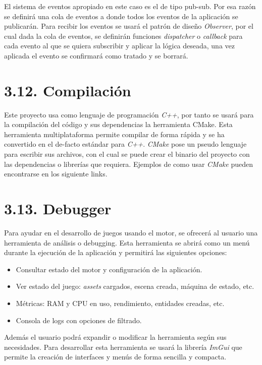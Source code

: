 El sistema de eventos apropiado en este caso es el de tipo \gls{pub-sub}\cite{event-system}. Por esa razón se definirá 
una cola de eventos a donde todos los eventos de la aplicación se publicarán. Para recibir los eventos
se usará el patrón de diseño \textit{Observer}\cite{observer-pattern}, por el cual dada la cola de eventos, se definirán
funciones \textit{dispatcher} o \textit{callback} para cada evento al que se quiera subscribir y aplicar la lógica deseada, una vez aplicada el evento
se confirmará como tratado y se borrará.

\section*{3.12. Compilación}\label{sec:compiler}

Este proyecto usa como lenguaje de programación \textit{C++}, por tanto se usará para la compilación del código y sus dependencias la herramienta
CMake\cite{cmake}. Esta herramienta multiplataforma permite compilar de forma rápida y se ha convertido
en el de-facto estándar para \textit{C++}. \textit{CMake} pose un pseudo lenguaje para escribir sus archivos, con el cual
se puede crear el binario del proyecto con las dependencias o librerías que requiera.
Ejemplos de como usar \textit{CMake} pueden encontrarse en los siguiente links\cite{using-cmake}\cite{cmake-tutorial}.

\section*{3.13. Debugger}\label{sec:debugger}

Para ayudar en el desarrollo de juegos usando el motor, se ofrecerá al usuario una herramienta de
análisis o debugging. Esta herramienta se abrirá como un menú durante la ejecución de la aplicación y permitirá las siguientes opciones:
\begin{itemize}
    \item Consultar estado del motor y configuración de la aplicación.
    \item Ver estado del juego: \textit{assets} cargados, escena creada, máquina de estado, etc.
    \item Métricas: RAM y CPU en uso, rendimiento, entidades creadas, etc. 
    \item Consola de logs con opciones de filtrado.
\end{itemize}
Además el usuario podrá expandir o modificar la herramienta según sus necesidades. Para desarrollar esta herramienta
se usará la librería \textit{ImGui}\cite{imgui} que permite la creación de interfaces y menús de forma sencilla y compacta.
